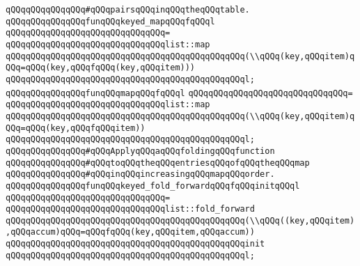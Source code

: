 \verb|qQQqqQQqqQQqqQQq#qQQqpairsqQQqinqQQqtheqQQqtable.|\newline
\newline
\verb|qQQqqQQqqQQqqQQqfunqQQqkeyed_mapqQQqfqQQql|\newline
\verb|qQQqqQQqqQQqqQQqqQQqqQQqqQQqqQQq=|\newline
\verb|qQQqqQQqqQQqqQQqqQQqqQQqqQQqqQQqlist::map|\newline
\verb|qQQqqQQqqQQqqQQqqQQqqQQqqQQqqQQqqQQqqQQqqQQqqQQq(\\qQQq(key,qQQqitem)qQQq=qQQq(key,qQQqfqQQq(key,qQQqitem)))|\newline
\verb|qQQqqQQqqQQqqQQqqQQqqQQqqQQqqQQqqQQqqQQqqQQqqQQql;|\newline
\newline
\verb|qQQqqQQqqQQqqQQqfunqQQqmapqQQqfqQQql|\newline
\verb|qQQqqQQqqQQqqQQqqQQqqQQqqQQqqQQq=|\newline
\verb|qQQqqQQqqQQqqQQqqQQqqQQqqQQqqQQqlist::map|\newline
\verb|qQQqqQQqqQQqqQQqqQQqqQQqqQQqqQQqqQQqqQQqqQQqqQQq(\\qQQq(key,qQQqitem)qQQq=qQQq(key,qQQqfqQQqitem))|\newline
\verb|qQQqqQQqqQQqqQQqqQQqqQQqqQQqqQQqqQQqqQQqqQQqqQQql;|\newline
\newline
\newline
\verb|qQQqqQQqqQQqqQQq#qQQqApplyqQQqaqQQqfoldingqQQqfunction|\newline
\verb|qQQqqQQqqQQqqQQq#qQQqtoqQQqtheqQQqentriesqQQqofqQQqtheqQQqmap|\newline
\verb|qQQqqQQqqQQqqQQq#qQQqinqQQqincreasingqQQqmapqQQqorder.|\newline
\newline
\verb|qQQqqQQqqQQqqQQqfunqQQqkeyed_fold_forwardqQQqfqQQqinitqQQql|\newline
\verb|qQQqqQQqqQQqqQQqqQQqqQQqqQQqqQQq=|\newline
\verb|qQQqqQQqqQQqqQQqqQQqqQQqqQQqqQQqlist::fold_forward|\newline
\verb|qQQqqQQqqQQqqQQqqQQqqQQqqQQqqQQqqQQqqQQqqQQqqQQq(\\qQQq((key,qQQqitem),qQQqaccum)qQQq=qQQqfqQQq(key,qQQqitem,qQQqaccum))|\newline
\verb|qQQqqQQqqQQqqQQqqQQqqQQqqQQqqQQqqQQqqQQqqQQqqQQqinit|\newline
\verb|qQQqqQQqqQQqqQQqqQQqqQQqqQQqqQQqqQQqqQQqqQQqqQQql;|\newline
\newline
